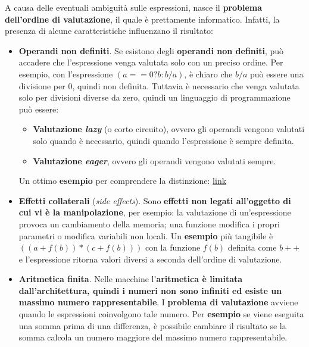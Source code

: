 \documentclass[a4paper]{article}
\begin{document}
	\noindent
	A causa delle eventuali ambiguità sulle espressioni, nasce il \textcolor{Red3}{\textbf{problema dell'ordine di valutazione}}, il quale è prettamente informatico. Infatti, la presenza di alcune caratteristiche influenzano il risultato:
	\begin{itemize}
		\item \textbf{Operandi non definiti}. Se esistono degli \textbf{operandi non definiti}, può accadere che l'espressione venga valutata solo con un preciso ordine. Per esempio, con l'espressione $\left(a == 0 ? b : b/a\right)$, è chiaro che $b/a$ può essere una divisione per $0$, quindi non definita. Tuttavia è necessario che venga valutata solo per divisioni diverse da zero, quindi un linguaggio di programmazione può essere:
		\begin{itemize}
			\item \textbf{Valutazione \textcolor{Red3}{\emph{lazy}}} (o corto circuito), ovvero gli operandi vengono valutati solo quando è necessario, quindi quando l'espressione è sempre definita.
			
			\item \textbf{Valutazione \textcolor{Red3}{\emph{eager}}}, ovvero gli operandi vengono valutati sempre.
		\end{itemize}
		Un ottimo \textcolor{Green4}{\textbf{esempio}} per comprendere la distinzione: \href{https://www.tutorialspoint.com/functional_programming_with_java/functional_programming_with_java_evaluation.htm}{link}
		
		\item \textbf{Effetti collaterali} (\emph{side effects}). Sono \textbf{effetti non legati all'oggetto di cui vi è la manipolazione}, per esempio: la valutazione di un'espressione provoca un cambiamento della memoria; una funzione modifica i propri parametri o modifica variabili non locali. Un \textcolor{Green4}{\textbf{esempio}} più tangibile è $\left(\left(a+f\left(b\right)\right) * \left(c+f\left(b\right)\right)\right)$ con la funzione $f\left(b\right)$ definita come $b++$ e l'espressione ritorna valori diversi a seconda dell'ordine di valutazione.
		
		\item \textbf{Aritmetica finita}. Nelle macchine l'\textbf{aritmetica è limitata dall'architettura, quindi i numeri non sono infiniti ed esiste un massimo numero rappresentabile}. I \textbf{problema di valutazione} avviene quando le espressioni coinvolgono tale numero.\newline
		Per \textcolor{Green4}{\textbf{esempio}} se viene eseguita una somma prima di una differenza, è possibile cambiare il risultato se la somma calcola un numero maggiore del massimo numero rappresentabile.
	\end{itemize}\newpage
	
\end{document}
